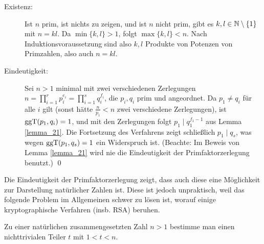 	\begin{description}
		\item[Existenz:] Ist $n$ prim, ist nichts zu zeigen, und ist $n$ nicht prim, gibt es $k, l \in \mathbb{N} \setminus \{1\}$ mit $n = kl$. 
		Da $\min\{k,l\} > 1$, folgt $\max \{k,l\} < n$. 
		Nach Induktionsvoraussetzung sind also $k,l$ Produkte von Potenzen von Primzahlen, also auch $n = kl$.
		\item[Eindeutigkeit:] Sei $n > 1$ minimal mit zwei verschiedenen Zerlegungen $n = \prod\limits_{i=1}^{r} p_i^{e_i} = \prod\limits_{i=1}^{s} q_i^{f_i}$, die $p_i, q_i$ prim und angeordnet. 
		Da $p_1 \neq q_i$ für alle $i$ gilt (sonst hätte $\frac{n}{p_1} < n$ zwei verschiedene Zerlegungen), ist\linebreak $\operatorname{ggT}(p_1,q_i) = 1$, und mit den Zerlegungen folgt $p_1 \mid q_1^{f_1 - 1}$ aus Lemma \ref{lemma_21}. 
		Die Fortsetzung des Verfahrens zeigt schließlich $p_1 \mid q_s$, was wegen $\operatorname{ggT}(p_1,q_s) = 1$ ein Widerspruch ist. 
		(Beachte: Im Beweis von Lemma \ref{lemma_21} wird nie die Eindeutigkeit der Primfaktorzerlegung benutzt.) \qed
	\end{description}

Die Eindeutigkeit der Primfaktorzerlegung zeigt, dass auch diese eine Möglichkeit zur Darstellung natürlicher Zahlen ist. 
Diese ist jedoch unpraktisch, weil das folgende Problem im Allgemeinen schwer zu lösen ist, worauf einige kryptographische Verfahren (insb. RSA) beruhen.

\begin{defn}[Faktorisierungsproblem]
	Zu einer natürlichen zusammengesetzten Zahl $n > 1$ bestimme man einen nichttrivialen Teiler $t$ mit $1 < t < n$.
\end{defn}

